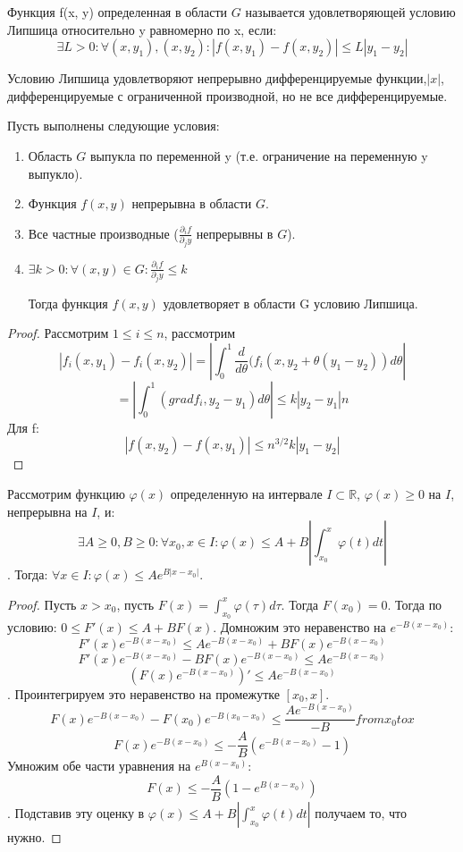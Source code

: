\documentclass[document.tex]{subfiles}
\begin{document}
\begin{definition}
Функция f(x, y) определенная в области $G$ называется удовлетворяющей условию Липшица относительно y равномерно по x, если:
$$\exists L > 0 : \forall (x, y_1), (x, y_2): |f(x, y_1) - f(x, y_2)| \leq L |y_1 - y_2|$$
\end{definition}

\begin{remark}
Условию Липшица удовлетворяют непрерывно дифференцируемые функции,$|x|$, дифференцируемые с ограниченной производной, но не все дифференцируемые.
\end{remark}
\begin{lemma}
Пусть выполнены следующие условия:
\begin{enumerate}
\item Область $G$ выпукла по переменной y (т.е. ограничение на переменную y выпукло).
\item Функция $f(x, y)$ непрерывна в области $G$.
\item Все частные производные ($\frac{\partial_i f}{\partial_j y}$ непрерывны в $G$).
\item $\exists k > 0: \forall (x, y) \in G : \frac{\partial_i f}{\partial_j y} \leq k$

Тогда функция $f(x, y)$ удовлетворяет в области G условию Липшица.
\end{enumerate}
\end{lemma}
\begin{proof}
Рассмотрим $1 \leq i \leq n$, рассмотрим 
$$|f_i(x, y_1) - f_i(x, y_2)| = |\int_0^1 \frac{d}{d \theta}(f_i(x, y_2 + \theta(y_1 - y_2))d \theta|$$
$$ = |\int_0^1 (grad f_i, y_2 - y_1)d\theta| \leq k |y_2 - y_1| n$$
Для f:
$$|f(x, y_2) - f(x, y_1)| \leq n^{3/2} k |y_1 - y_2|$$
\end{proof}

\begin{lemma}[Гронуолла]
Рассмотрим функцию $\varphi(x)$ определенную на интервале $I \subset \mathbb{R}$, $\varphi(x) \geq 0$ на $I$, непрерывна на $I$, и:
$$\exists A \geq 0, B \geq 0 : \forall x_0, x \in I: \varphi(x) \leq A+B|\int_{x_0}^x \varphi(t) dt|$$.
Тогда: $\forall x \in I : \varphi(x) \leq Ae^{B|x - x_0|}$.
\end{lemma}
\begin{proof}
Пусть $x > x_0$, пусть $F(x) = \int_{x_0}^x \varphi(\tau) d\tau$. Тогда $F(x_0) = 0$. Тогда по условию: $0 \leq F'(x) \leq A + BF(x)$. Домножим это неравенство на $e^{-B(x - x_0)}$:
$$F'(x)e^{-B(x - x_0)} \leq Ae^{-B(x - x_0)} + BF(x)e^{-B(x - x_0)}$$
$$F'(x)e^{-B(x-x_0)} - BF(x)e^{-B(x - x_0)} \leq Ae^{-B(x - x_0)}$$
$$(F(x)e^{-B(x-x_0)})' \leq Ae^{-B(x - x_0)}$$.
Проинтегрируем это неравенство на промежутке $[x_0, x]$.
$$F(x)e^{-B(x-x_0)} - F(x_0)e^{-B(x_0-x_0)} \leq \frac{Ae^{-B(x - x_0)}}{-B} from x_0 to x$$
$$F(x)e^{-B(x-x_0)} \leq -\frac{A}{B}(e^{-B(x - x_0)} - 1)$$
Умножим обе части уравнения на $e^{B(x - x_0)}$:
$$F(x) \leq -\frac{A}{B}(1 - e^{B(x - x_0)})$$.
Подставив эту оценку в $\varphi(x) \leq A+B|\int_{x_0}^x \varphi(t) dt|$ получаем то, что нужно.
\end{proof}
\end{document}
